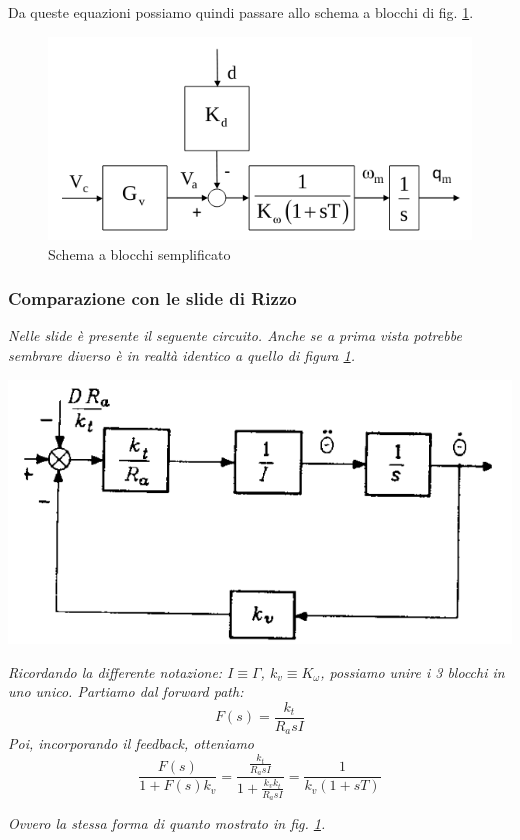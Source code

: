Da queste equazioni possiamo quindi passare allo schema a blocchi di fig. \ref{fig:decentralizedjointspacecontrol4}.

\begin{figure}[H]
	\centering
	\includegraphics[width=0.6\linewidth]{images/decentralized_joint_space_control_4}
	\caption{Schema a blocchi semplificato}
	\label{fig:decentralizedjointspacecontrol4}
\end{figure}




\vspace*{25pt}
\begin{mdframed}[leftmargin=15pt, rightmargin=15pt, leftline=false, rightline=false]
\subsubsection{Comparazione con le slide di Rizzo}
\textit{Nelle slide è presente il seguente circuito. Anche se a prima vista potrebbe sembrare diverso è in realtà identico a quello di figura \ref{fig:decentralizedjointspacecontrol4}.}

{
	\centering
	\includegraphics[width=0.6\linewidth]{images/decentralized_joint_space_control_5}
	\label{fig:decentralizedjointspacecontrol5}
	\par
}

\textit{Ricordando la differente notazione: $I \equiv \Gamma$, $k_v \equiv K_\omega$, possiamo unire i 3 blocchi in uno unico. Partiamo dal forward path:}
$$
F(s) = \frac{k_t}{R_a sI}
$$
\textit{Poi, incorporando il feedback, otteniamo}
$$
\frac{F(s)}{1 + F(s)k_v} = 
\frac{ \frac{k_t}{R_a sI} }{1 +  \frac{k_v k_t}{R_a sI} } = \frac{1}{k_v(1 + sT)}
$$

\textit{Ovvero la stessa forma di quanto mostrato in fig. \ref{fig:decentralizedjointspacecontrol4}.}
\end{mdframed}




